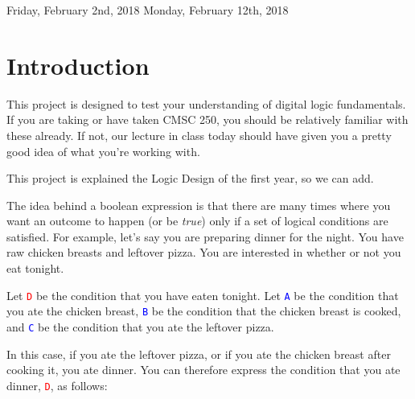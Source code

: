 \documentclass{article}
\begin{document}
\newcommand{\mysubsection}[1]{
    {\fontsize{13}{15}\selectfont\bf \item #1}}
    
\newenvironment{subenv}[1]
{\section{#1}\vspace{.5em}\begin{enumerate}}
{\end{enumerate}}

\newcommand{\varin}[1]{\textcolor{blue}{\texttt{#1}}}
\newcommand{\varout}[1]{\textcolor{red}{\texttt{#1}}}



\large

            {Friday, February 2nd, 2018}
            {Monday, February 12th, 2018}

\section{Introduction}
    \par This project is designed to test your understanding of digital logic fundamentals.  If you are taking or have taken CMSC 250, you should be relatively familiar with these already.  If not, our lecture in class today should have given you a pretty good idea of what you're working with.
    \par This project is explained the Logic Design of the first year, so we can add.
    
    \par The idea behind a boolean expression is that there are many times where you want an outcome to happen (or be \emph{true}) only if a set of logical conditions are satisfied.  For example, let's say you are preparing dinner for the night.  You have raw chicken breasts and leftover pizza.  You are interested in whether or not you eat tonight.  
    
    \par Let \varout{D} be the condition that you have eaten tonight.  Let \varin{A} be the condition that you ate the chicken breast, \varin{B} be the condition that the chicken breast is cooked, and \varin{C} be the condition that you ate the leftover pizza.
    
    \par In this case, if you ate the leftover pizza, or if you ate the chicken breast after cooking it, you ate dinner.  You can therefore express the condition that you ate dinner, \varout{D}, as follows:
    
\end{document}
